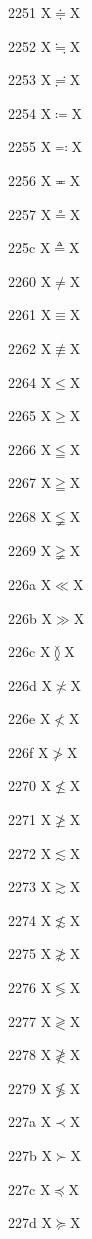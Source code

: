 \documentclass[11pt]{article}
\begin{document}
2251 X{\ensuremath{\doteqdot}}X

2252 X{\ensuremath{\fallingdotseq}}X

2253 X{\ensuremath{\risingdotseq}}X

2254 X{\ensuremath{\coloneq}}X

2255 X{\ensuremath{\eqcolon}}X

2256 X{\ensuremath{\eqcirc}}X

2257 X{\ensuremath{\circeq}}X

225c X{\ensuremath{\triangleq}}X

2260 X{\ensuremath{\ne}}X

2261 X{\ensuremath{\equiv}}X

2262 X{\ensuremath{\nequiv}}X

2264 X{\ensuremath{\leq}}X

2265 X{\ensuremath{\geq}}X

2266 X{\ensuremath{\leqq}}X

2267 X{\ensuremath{\geqq}}X

2268 X{\ensuremath{\lneqq}}X

2269 X{\ensuremath{\gneqq}}X

226a X{\ensuremath{\ll}}X

226b X{\ensuremath{\gg}}X

226c X{\ensuremath{\between}}X

226d X{\ensuremath{\not\asymp}}X

226e X{\ensuremath{\nless}}X

226f X{\ensuremath{\ngtr}}X

2270 X{\ensuremath{\nleq}}X

2271 X{\ensuremath{\ngeq}}X

2272 X{\ensuremath{\lesssim}}X

2273 X{\ensuremath{\gtrsim}}X

2274 X{\ensuremath{\nlesssim}}X

2275 X{\ensuremath{\ngtrsim}}X

2276 X{\ensuremath{\lessgtr}}X

2277 X{\ensuremath{\gtrless}}X

2278 X{\ensuremath{\ngtrless}}X

2279 X{\ensuremath{\nlessgtr}}X

227a X{\ensuremath{\prec}}X

227b X{\ensuremath{\succ}}X

227c X{\ensuremath{\preccurlyeq}}X

227d X{\ensuremath{\succcurlyeq}}X
\end{document}
